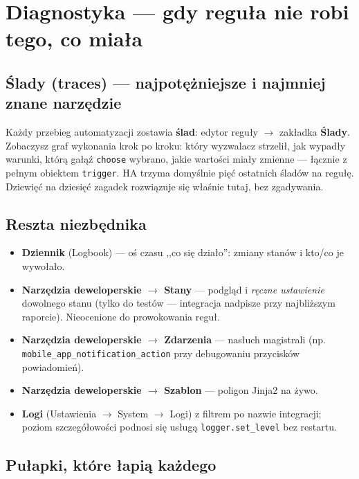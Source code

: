 \documentclass[11pt,a4paper]{article}
\begin{document}
\section{Diagnostyka --- gdy reguła nie robi tego, co miała}
\label{sec:debug}

\subsection{Ślady (traces) --- najpotężniejsze i najmniej znane narzędzie}

Każdy przebieg automatyzacji zostawia \textbf{ślad}: edytor reguły $\to$ zakładka \textbf{Ślady}. Zobaczysz graf wykonania krok po kroku: który wyzwalacz strzelił, jak wypadły warunki, którą gałąź \texttt{choose} wybrano, jakie wartości miały zmienne --- łącznie z pełnym obiektem \texttt{trigger}. HA trzyma domyślnie pięć ostatnich śladów na regułę. Dziewięć na dziesięć zagadek rozwiązuje się właśnie tutaj, bez zgadywania.

\subsection{Reszta niezbędnika}

\begin{itemize}
\item \textbf{Dziennik} (Logbook) --- oś czasu ,,co się działo'': zmiany stanów i kto/co je wywołało.
\item \textbf{Narzędzia deweloperskie $\to$ Stany} --- podgląd i \emph{ręczne ustawienie} dowolnego stanu (tylko do testów --- integracja nadpisze przy najbliższym raporcie). Nieocenione do prowokowania reguł.
\item \textbf{Narzędzia deweloperskie $\to$ Zdarzenia} --- nasłuch magistrali (np. \texttt{mobile\_app\_notification\_action} przy debugowaniu przycisków powiadomień).
\item \textbf{Narzędzia deweloperskie $\to$ Szablon} --- poligon Jinja2 na żywo.
\item \textbf{Logi} (Ustawienia $\to$ System $\to$ Logi) z filtrem po nazwie integracji; poziom szczegółowości podnosi się usługą \texttt{logger.set\_level} bez restartu.
\end{itemize}

\subsection{Pułapki, które łapią każdego}
\end{document}

